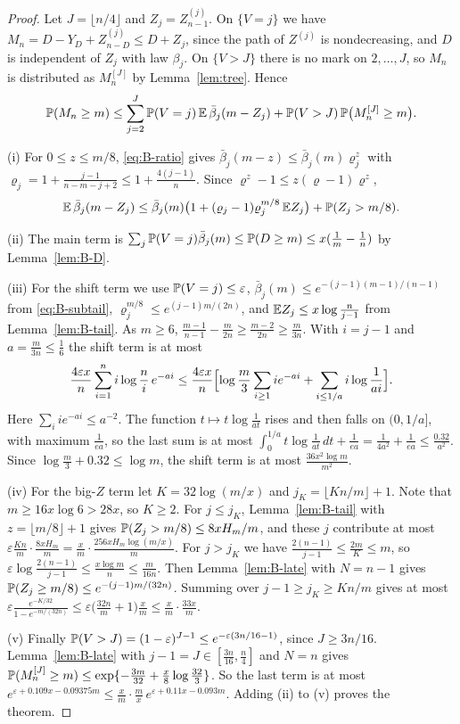 \begin{proof}
Let $J=\lfloor n/4\rfloor$ and $Z_j=Z^{(j)}_{n-1}$. On $\{V=j\}$ we have
$M_n=D-Y_D+Z^{(j)}_{n-D}\le D+Z_j$, since the path of $Z^{(j)}$ is
nondecreasing, and $D$ is independent of $Z_j$ with law $\beta_j$. On
$\{V>J\}$ there is no mark on $2,\dots,J$, so $M_n$ is distributed as
$M^{[J]}_n$ by Lemma~\ref{lem:tree}. Hence
\[
 \mathbb{P}(M_n\ge m)\le\sum_{j=2}^J\mathbb{P}(V=j)\,\mathbb{E}\,\bar\beta_j(m-Z_j)
 +\mathbb{P}(V>J)\,\mathbb{P}\bigl(M^{[J]}_n\ge m\bigr).
\]

(i) For $0\le z\le m/8$, \eqref{eq:B-ratio} gives
$\bar\beta_j(m-z)\le\bar\beta_j(m)\varrho_j^z$ with
$\varrho_j=1+\frac{j-1}{n-m-j+2}\le1+\frac{4(j-1)}n$. Since
$\varrho^z-1\le z(\varrho-1)\varrho^z$,
\[
 \mathbb{E}\,\bar\beta_j(m-Z_j)\le\bar\beta_j(m)\bigl(1+(\varrho_j-1)\varrho_j^{m/8}\,\mathbb{E} Z_j\bigr)+\mathbb{P}(Z_j>m/8).
\]

(ii) The main term is
$\sum_j\mathbb{P}(V=j)\bar\beta_j(m)\le\mathbb{P}(D\ge m)\le x(\frac1m-\frac1n)$ by
Lemma~\ref{lem:B-D}.

(iii) For the shift term we use $\mathbb{P}(V=j)\le\varepsilon$,
$\bar\beta_j(m)\le e^{-(j-1)(m-1)/(n-1)}$ from \eqref{eq:B-subtail},
$\varrho_j^{m/8}\le e^{(j-1)m/(2n)}$, and $\mathbb{E} Z_j\le x\log\frac n{j-1}$
from Lemma~\ref{lem:B-tail}. As $m\ge6$,
$\frac{m-1}{n-1}-\frac m{2n}\ge\frac{m-2}{2n}\ge\frac m{3n}$. With $i=j-1$
and $a=\frac m{3n}\le\frac16$ the shift term is at most
\[
 \frac{4\varepsilon x}n\sum_{i=1}^{n}i\log\frac ni\,e^{-ai}
 \le\frac{4\varepsilon x}n\Bigl[\log\frac m3\sum_{i\ge1}ie^{-ai}
 +\sum_{i\le1/a}i\log\frac1{ai}\Bigr].
\]
Here $\sum_iie^{-ai}\le a^{-2}$. The function $t\mapsto t\log\frac1{at}$
rises and then falls on $(0,1/a]$, with maximum $\frac1{ea}$, so the last
sum is at most $\int_0^{1/a}t\log\frac1{at}\,dt+\frac1{ea}=\frac1{4a^2}+\frac1{ea}\le\frac{0.32}{a^2}$.
Since $\log\frac m3+0.32\le\log m$, the shift term is at most
$\frac{36x^2\log m}{m^2}$.

(iv) For the big-$Z$ term let $K=32\log(m/x)$ and
$j_K=\lfloor Kn/m\rfloor+1$. Note that $m\ge16x\log6>28x$, so $K\ge2$. For
$j\le j_K$, Lemma~\ref{lem:B-tail} with $z=\lfloor m/8\rfloor+1$ gives
$\mathbb{P}(Z_j>m/8)\le8xH_m/m$, and
these $j$ contribute at most
$\varepsilon\frac{Kn}m\cdot\frac{8xH_m}m=\frac xm\cdot\frac{256xH_m\log(m/x)}m$.
For $j>j_K$ we have $\frac{2(n-1)}{j-1}\le\frac{2m}K\le m$, so
$\varepsilon\log\frac{2(n-1)}{j-1}\le\frac{x\log m}n\le\frac m{16n}$. Then
Lemma~\ref{lem:B-late} with $N=n-1$ gives
$\mathbb{P}(Z_j\ge m/8)\le e^{-(j-1)m/(32n)}$. Summing over $j-1\ge j_K\ge Kn/m$
gives at most
$\varepsilon\frac{e^{-K/32}}{1-e^{-m/(32n)}}\le\varepsilon\bigl(\frac{32n}m+1\bigr)\frac xm\le\frac xm\cdot\frac{33x}m$.

(v) Finally $\mathbb{P}(V>J)=(1-\varepsilon)^{J-1}\le e^{-\varepsilon(3n/16-1)}$,
since $J\ge3n/16$. Lemma~\ref{lem:B-late} with $j-1=J\in[\frac{3n}{16},\frac n4]$
and $N=n$ gives
$\mathbb{P}(M^{[J]}_n\ge m)\le\exp\{-\frac{3m}{32}+\frac x8\log\frac{32}3\}$. So
the last term is at most
$e^{\varepsilon+0.109x-0.09375m}\le\frac xm\cdot\frac mx\,e^{\varepsilon+0.11x-0.093m}$.
Adding (ii) to (v) proves the theorem.
\end{proof}

